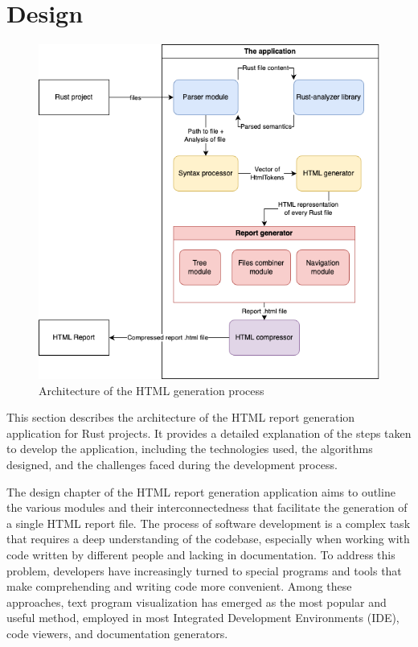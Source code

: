\section{Design}
\label{meth:design}
\begin{figure}[ht]
\centering
\includegraphics[width=15cm]{figs/thesis_flow3.png}
\caption{Architecture of the HTML generation process}
\label{fig:flow}
\end{figure}


This section describes the architecture of the HTML report generation application for Rust projects. It provides a detailed explanation of the steps taken to develop the application, including the technologies used, the algorithms designed, and the challenges faced during the development process.

The design chapter of the HTML report generation application aims to outline the various modules and their interconnectedness that facilitate the generation of a single HTML report file. The process of software development is a complex task that requires a deep understanding of the codebase, especially when working with code written by different people and lacking in documentation. To address this problem, developers have increasingly turned to special programs and tools that make comprehending and writing code more convenient. Among these approaches, text program visualization has emerged as the most popular and useful method, employed in most Integrated Development Environments (IDE), code viewers, and documentation generators.

